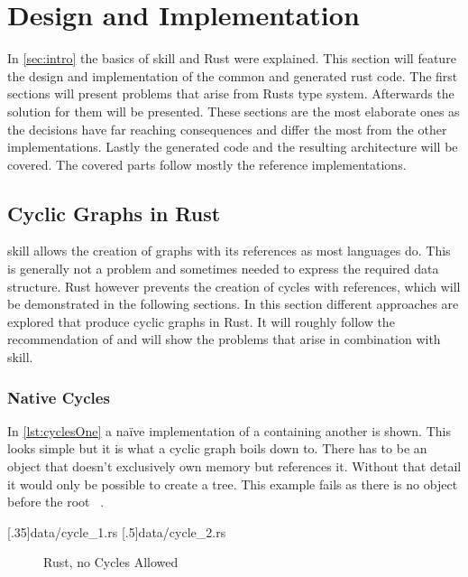 \documentclass[thesis]{subfiles}
\begin{document}
\chapter{Design and Implementation}
In \autoref{sec:intro} the basics of \gls{skill} and Rust were explained.
This section will feature the design and implementation of the common and generated rust code.
The first sections will present problems that arise from Rusts type system.
Afterwards the solution for them will be presented.
These sections are the most elaborate ones as the decisions have far reaching consequences and differ the most from the other implementations.
Lastly the generated code and the resulting architecture will be covered.
The covered parts follow mostly the reference implementations.

\section{Cyclic Graphs in Rust}\label{sec:graph}
  \gls{skill} allows the creation of graphs with its references\autocite[9]{skill-dis} as most languages do.
  This is generally not a problem and sometimes needed to express the required data structure.
  Rust however prevents the creation of cycles with references, which will be demonstrated in the following sections.
  In this section different approaches are explored that produce cyclic graphs in Rust.
  It will roughly follow the recommendation of \autocite{rust-faq} and will show the problems that arise in combination with \gls{skill}.

  \subsection{Native Cycles}
    In \autoref{lst:cyclesOne} a na\"ive implementation of a \Node containing another \Node is shown.
    This looks simple but it is what a cyclic graph boils down to.
    There has to be an object that doesn't exclusively own memory but references it.
    Without that detail it would only be possible to create a tree.
    This example fails as there is no \Node object before the root \Node~.

    \LstTikzBox{\cyclesOne}[.35\linewidth]{data/cycle_1.rs}
    \LstTikzBox{\cyclesTwo}[.5\linewidth]{data/cycle_2.rs}

    \begin{figure}[ht]
      \captionsetup{type=lstlisting}
       \hfill%
      \caption{Rust, no Cycles Allowed}\label{lst:cycles}
    \end{figure}
\end{document}
